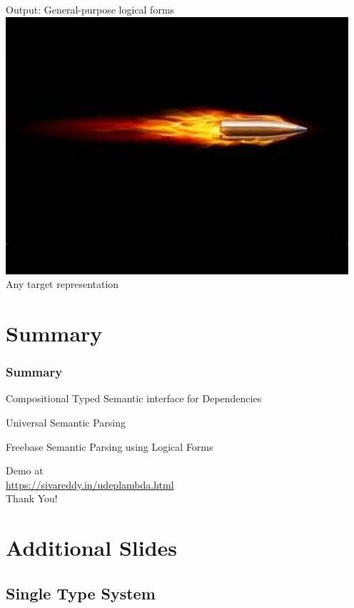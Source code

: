 \documentclass[mathserif,12pt]{beamer}
\newcommand{\hlight}[1]{{\color{blue!80} #1}}
\begin{document}
\begin{frame}
\pause
\vspace{2em}
Output: General-purpose logical forms\\
\pause \includegraphics[trim=16em 14em 4em 10em,clip=true,scale=0.2]{figures/bullet}\; Any target representation
\end{frame}

\section{Summary}
\begin{frame}
\frametitle{Summary}
\large


Compositional Typed Semantic interface for Dependencies
 
\vspace{2em} 
Universal Semantic Parsing

 \vspace{2em}
Freebase Semantic Parsing using Logical Forms

\vspace{2em}
\begin{center}Demo at\\ \hlight{\url{https://sivareddy.in/udeplambda.html}} \\
  Thank You!
\end{center}
\end{frame}


\section{Additional Slides}


\subsection{Single Type System}
\end{document}
